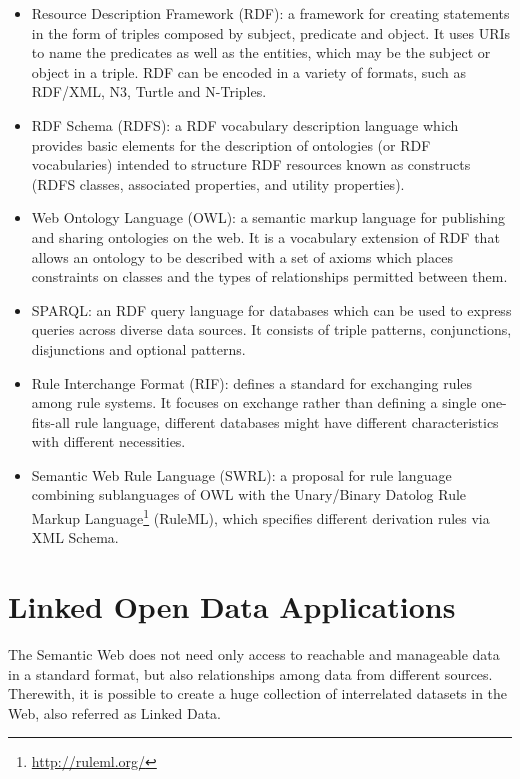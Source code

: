 \begin{itemize}
 \item Resource Description Framework (RDF): a framework for creating statements in the form of triples composed by
subject, predicate and object. It uses URIs to name the predicates as well as the entities, which may be the subject
or
object in a triple. RDF can be encoded in a variety of formats, such as RDF/XML, N3, Turtle and N-Triples.
 \item RDF Schema (RDFS): a RDF vocabulary description language which provides basic elements for the description of
ontologies (or RDF vocabularies) intended to structure RDF resources known as constructs (RDFS classes, associated
properties, and utility properties).
 \item Web Ontology Language (OWL): a semantic markup language for publishing and sharing ontologies on the web. It is
a
vocabulary extension of RDF that allows an ontology to be described with a set of axioms which places constraints on
classes and the types of relationships permitted between them.
 \item SPARQL: an RDF query language for databases which can be used to express queries across diverse data sources.
It
consists of triple patterns, conjunctions, disjunctions and optional patterns. 
 \item Rule Interchange Format (RIF): defines a standard for exchanging rules among rule systems. It focuses on
exchange rather than defining a single one-fits-all rule language, different databases might have different
characteristics with different necessities.
  \item Semantic Web Rule Language (SWRL): a proposal for rule language combining sublanguages of OWL with the
Unary/Binary Datolog Rule Markup Language\footnote{\url{http://ruleml.org/}} (RuleML), which specifies different
derivation rules via XML Schema.
\end{itemize}



\section{Linked Open Data Applications}
\label{sec:rw-lod}

The Semantic Web does not need only access to reachable and manageable data in a standard format, but also
relationships among data from different sources. Therewith, it is possible to create a huge collection of interrelated
datasets in the Web, also referred as Linked Data.

